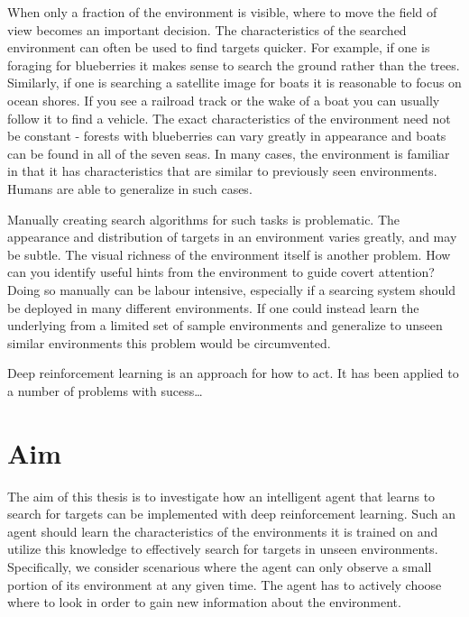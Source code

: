 When only a fraction of the environment is visible, where to move the field of view becomes an important decision.
The characteristics of the searched environment can often be used to find targets quicker.
For example, if one is foraging for blueberries it makes sense to search the ground rather than the trees.
Similarly, if one is searching a satellite image for boats it is reasonable to focus on ocean shores.
If you see a railroad track or the wake of a boat you can usually follow it to find a vehicle.
The exact characteristics of the environment need not be constant - forests with blueberries can vary greatly in appearance and boats can be found in all of the seven seas.
In many cases, the environment is familiar in that it has characteristics that are similar to previously seen environments.
Humans are able to generalize in such cases.

Manually creating search algorithms for such tasks is problematic.
The appearance and distribution of targets in an environment varies greatly, and may be subtle.
The visual richness of the environment itself is another problem.
How can you identify useful hints from the environment to guide covert attention?
Doing so manually can be labour intensive, especially if a searcing system should be deployed in many different environments.
If one could instead learn the underlying from a limited set of sample environments and generalize to unseen similar environments this problem would be circumvented.


Deep reinforcement learning is an approach for how to act.
It has been applied to a number of problems with sucess\dots


\section{Aim}
\label{sec:aim}



The aim of this thesis is to investigate how an intelligent agent that learns to search for targets can be implemented with deep reinforcement learning.
Such an agent should learn the characteristics of the environments it is trained on and utilize this knowledge to effectively search for targets in unseen environments.
Specifically, we consider scenarious where the agent can only observe a small portion of its environment at any given time.
The agent has to actively choose where to look in order to gain new information about the environment.

